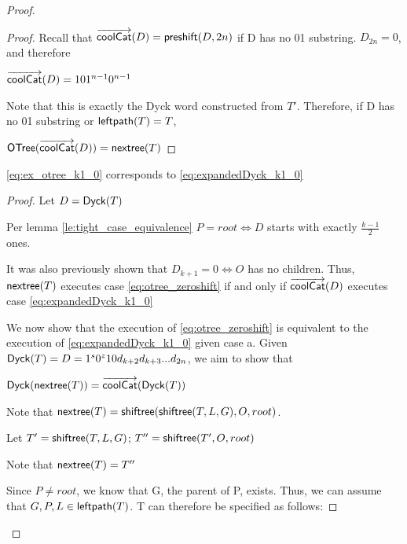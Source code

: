 \begin{proof}
\begin{proof}
    Recall that $\overrightarrow{\mathsf{coolCat}}{(D)}=\mathsf{preshift(} D, 2n \mathsf{)}$ if D has no 01 substring. $D_{2n}=0$, and therefore 

    $\overrightarrow{\mathsf{coolCat}}{(D)}=101^{n-1}0^{n-1}$
     
     Note that this is exactly the Dyck word constructed from $T'$.  Therefore, if D has no 01 substring or $\mathsf{leftpath}{(T)}=T$, 

     $\mathsf{OTree}{(\overrightarrow{\mathsf{coolCat}}{(D)})}=\mathsf{nextree}{(T)}$

\end{proof}
\begin{lemma}
    \ref{eq:ex_otree_k1_0} corresponds to \ref{eq:expandedDyck_k1_0}
\end{lemma}
\begin{proof}
    Let $D=\mathsf{Dyck}{(T)}$

    Per lemma \ref{le:tight_case_equivalence} $P=root \iff D$ starts with exactly $\frac{k-1}{2}$ ones.  

    It was also previously shown that $D_{k+1}=0 \iff O$ has no children.  
    Thus, $\mathsf{nextree}{(T)}$ executes case \ref{eq:otree_zeroshift} 
    if and only if $\overrightarrow{\mathsf{coolCat}}{(D)}$ executes case   \ref{eq:expandedDyck_k1_0}

    \bigskip

    We now show that the execution of \ref{eq:otree_zeroshift} is equivalent to the execution of \ref{eq:expandedDyck_k1_0} given case a.
    Given $\mathsf{Dyck}{(T)}=D=1^s0^{z}10d_{k+2}d_{k+3}...d_{2n}$, we aim to show that 

    $\mathsf{Dyck}{(\mathsf{nextree}{(T)})}=\overrightarrow{\mathsf{coolCat}}{(\mathsf{Dyck}{(T)})}$
    \bigskip

    Note that $\mathsf{nextree}{(T)}=\mathsf{shiftree(} \mathsf{shiftree(} T, L, G \mathsf{)}, O, root \mathsf{)}$. 

    Let $T'=\mathsf{shiftree(} T, L, G \mathsf{)}$; $T''=\mathsf{shiftree(} T', O, root \mathsf{)}$

    Note that $\mathsf{nextree}{(T)}=T''$

    Since $P \ne root$, we know that G, the parent of P, exists. 
    Thus, we can assume that $G,P,L \in \mathsf{leftpath}{(T)}$.  T can therefore be specified as follows: 





\end{proof}
\end{proof}
